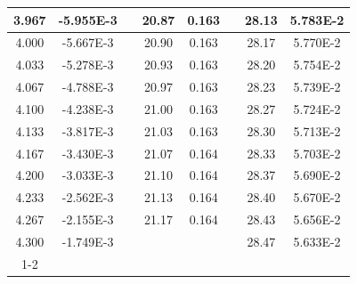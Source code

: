 \documentclass[article,12pt]{elsarticle}
\begin{document}
\begin{longtable}[c]{|c|c|cccccc}
3.967    & -5.955E-3 & \multicolumn{1}{c|}{} & \multicolumn{1}{c|}{20.87}   & \multicolumn{1}{c|}{0.163} & \multicolumn{1}{c|}{} & \multicolumn{1}{c|}{28.13}   & \multicolumn{1}{c|}{5.783E-2} \\ \hline
4.000    & -5.667E-3 & \multicolumn{1}{c|}{} & \multicolumn{1}{c|}{20.90}   & \multicolumn{1}{c|}{0.163} & \multicolumn{1}{c|}{} & \multicolumn{1}{c|}{28.17}   & \multicolumn{1}{c|}{5.770E-2} \\ \hline
4.033    & -5.278E-3 & \multicolumn{1}{c|}{} & \multicolumn{1}{c|}{20.93}   & \multicolumn{1}{c|}{0.163} & \multicolumn{1}{c|}{} & \multicolumn{1}{c|}{28.20}   & \multicolumn{1}{c|}{5.754E-2} \\ \hline
4.067    & -4.788E-3 & \multicolumn{1}{c|}{} & \multicolumn{1}{c|}{20.97}   & \multicolumn{1}{c|}{0.163} & \multicolumn{1}{c|}{} & \multicolumn{1}{c|}{28.23}   & \multicolumn{1}{c|}{5.739E-2} \\ \hline
4.100    & -4.238E-3 & \multicolumn{1}{c|}{} & \multicolumn{1}{c|}{21.00}   & \multicolumn{1}{c|}{0.163} & \multicolumn{1}{c|}{} & \multicolumn{1}{c|}{28.27}   & \multicolumn{1}{c|}{5.724E-2} \\ \hline
4.133    & -3.817E-3 & \multicolumn{1}{c|}{} & \multicolumn{1}{c|}{21.03}   & \multicolumn{1}{c|}{0.163} & \multicolumn{1}{c|}{} & \multicolumn{1}{c|}{28.30}   & \multicolumn{1}{c|}{5.713E-2} \\ \hline
4.167    & -3.430E-3 & \multicolumn{1}{c|}{} & \multicolumn{1}{c|}{21.07}   & \multicolumn{1}{c|}{0.164} & \multicolumn{1}{c|}{} & \multicolumn{1}{c|}{28.33}   & \multicolumn{1}{c|}{5.703E-2} \\ \hline
4.200    & -3.033E-3 & \multicolumn{1}{c|}{} & \multicolumn{1}{c|}{21.10}   & \multicolumn{1}{c|}{0.164} & \multicolumn{1}{c|}{} & \multicolumn{1}{c|}{28.37}   & \multicolumn{1}{c|}{5.690E-2} \\ \hline
4.233    & -2.562E-3 & \multicolumn{1}{c|}{} & \multicolumn{1}{c|}{21.13}   & \multicolumn{1}{c|}{0.164} & \multicolumn{1}{c|}{} & \multicolumn{1}{c|}{28.40}   & \multicolumn{1}{c|}{5.670E-2} \\ \hline
4.267    & -2.155E-3 & \multicolumn{1}{c|}{} & \multicolumn{1}{c|}{21.17}   & \multicolumn{1}{c|}{0.164} & \multicolumn{1}{c|}{} & \multicolumn{1}{c|}{28.43}   & \multicolumn{1}{c|}{5.656E-2} \\ \hline
4.300    & -1.749E-3 &                       &                              &                            & \multicolumn{1}{c|}{} & \multicolumn{1}{c|}{28.47}   & \multicolumn{1}{c|}{5.633E-2} \\ \cline{1-2} \cline{7-8} 

\end{longtable}
\end{document}
